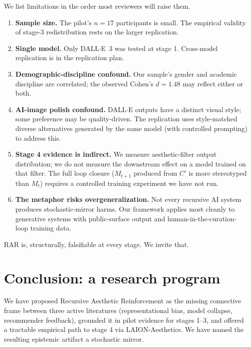\documentclass[sigconf,nonacm]{acmart}
\begin{document}
We list limitations in the order most reviewers will raise them.

\begin{enumerate}
  \item \textbf{Sample size.} The pilot's \(n=17\) participants is small. The empirical validity of stage-3 redistribution rests on the larger replication.
  \item \textbf{Single model.} Only DALL$\cdot$E~3 was tested at stage 1. Cross-model replication is in the replication plan.
  \item \textbf{Demographic-discipline confound.} Our sample's gender and academic discipline are correlated; the observed Cohen's \(d = 1.48\) may reflect either or both.
  \item \textbf{AI-image polish confound.} DALL$\cdot$E outputs have a distinct visual style; some preference may be quality-driven. The replication uses style-matched diverse alternatives generated by the same model (with controlled prompting) to address this.
  \item \textbf{Stage 4 evidence is indirect.} We measure aesthetic-filter output distribution; we do not measure the downstream effect on a model trained on that filter. The full loop closure (\(M_{t+1}\) produced from \(C'\) is more stereotyped than \(M_t\)) requires a controlled training experiment we have not run.
  \item \textbf{The metaphor risks overgeneralization.} Not every recursive AI system produces stochastic-mirror harms. Our framework applies most cleanly to generative systems with public-surface output and human-in-the-curation-loop training data.
\end{enumerate}

RAR is, structurally, falsifiable at every stage. We invite that.

\section{Conclusion: a research program}

We have proposed Recursive Aesthetic Reinforcement as the missing connective frame between three active literatures (representational bias, model collapse, recommender feedback), grounded it in pilot evidence for stages 1--3, and offered a tractable empirical path to stage 4 via LAION-Aesthetics. We have named the resulting epistemic artifact a stochastic mirror.
\end{document}
